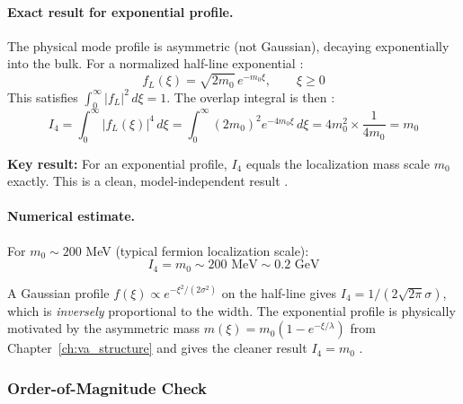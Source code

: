 \paragraph{Exact result for exponential profile.}
The physical mode profile is asymmetric (not Gaussian), decaying exponentially
into the bulk. For a normalized half-line exponential \tagM{}:
\begin{equation}
    f_L(\xi) = \sqrt{2m_0} \, e^{-m_0\xi}, \qquad \xi \geq 0
    \label{eq:ch11_fL}
\end{equation}
This satisfies $\int_0^\infty |f_L|^2 \, d\xi = 1$. The overlap integral is
then \tagDc{}:
\begin{equation}
    \boxed{
    I_4 = \int_0^\infty |f_L(\xi)|^4 \, d\xi
    = \int_0^\infty (2m_0)^2 e^{-4m_0\xi} \, d\xi
    = 4m_0^2 \times \frac{1}{4m_0} = m_0
    }
    \label{eq:ch11_I4_exact}
\end{equation}

\textbf{Key result:} For an exponential profile, $I_4$ equals the localization
mass scale $m_0$ exactly. This is a clean, model-independent result \tagDc{}.

\paragraph{Numerical estimate.}
For $m_0 \sim 200$ MeV (typical fermion localization scale):
\begin{equation}
    I_4 = m_0 \sim 200 \text{ MeV} \sim 0.2 \text{ GeV}
    \label{eq:ch11_I4_estimate}
\end{equation}

\begin{remark}
\label{rem:ch11_gaussian_vs_exp}
A Gaussian profile $f(\xi) \propto e^{-\xi^2/(2\sigma^2)}$ on the half-line gives
$I_4 = 1/(2\sqrt{2\pi}\sigma)$, which is \emph{inversely} proportional to the
width. The exponential profile is physically motivated by the asymmetric mass
$m(\xi) = m_0(1 - e^{-\xi/\lambda})$ from Chapter~\ref{ch:va_structure} and
gives the cleaner result $I_4 = m_0$ \tagDc{}.
\end{remark}

\subsubsection{Order-of-Magnitude Check}

